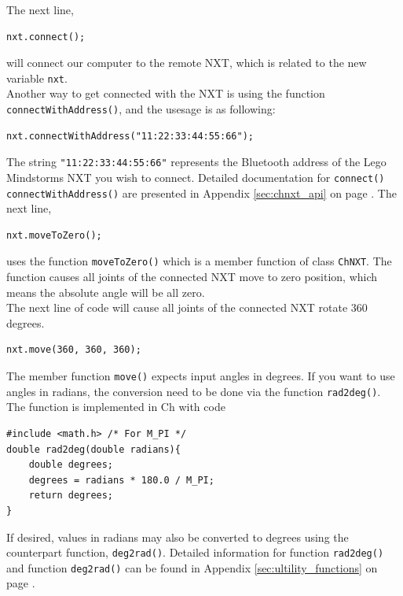 \documentclass[11pt]{article}
\begin{document}
The next line,
\begin{verbatim}
nxt.connect();
\end{verbatim}

will connect our computer to the remote NXT, which is related to the new variable \texttt{nxt}.\\

Another way to get connected with the NXT is using the function \texttt{connectWithAddress()}, and the usesage
is as following:

\begin{verbatim}
nxt.connectWithAddress("11:22:33:44:55:66");
\end{verbatim}

The string \texttt{"11:22:33:44:55:66"} represents the Bluetooth address of the Lego Mindstorms NXT you wish 
to connect. Detailed documentation for \texttt{connect()} \texttt{connectWithAddress()} are presented in 
Appendix \ref{sec:chnxt_api} on page \pageref{sec:chnxt_api}. The next line,

\begin{verbatim}
nxt.moveToZero();
\end{verbatim}

uses the function \texttt{moveToZero()} which is a member function of class \texttt{ChNXT}. The function causes
all joints of the connected NXT move to zero position, which means the absolute angle will be all zero.\\

The next line of code will cause all joints of the connected NXT rotate 360 degrees.

\begin{verbatim}
nxt.move(360, 360, 360);
\end{verbatim}

The member function \texttt{move()} expects input angles in degrees. If you want to use angles in radians, the 
conversion need to be done via the function \texttt{rad2deg()}. The function is implemented in Ch with code

\begin{verbatim}
#include <math.h> /* For M_PI */
double rad2deg(double radians){
    double degrees;
    degrees = radians * 180.0 / M_PI;
    return degrees;
}
\end{verbatim}

If desired, values in radians may also be converted to degrees using the counterpart function, \texttt{deg2rad()}.
Detailed information for function \texttt{rad2deg()} and function \texttt{deg2rad()} can be found in Appendix 
\ref{sec:ultility_functions} on page \pageref{sec:ultility_functions}.\\
\end{document}
